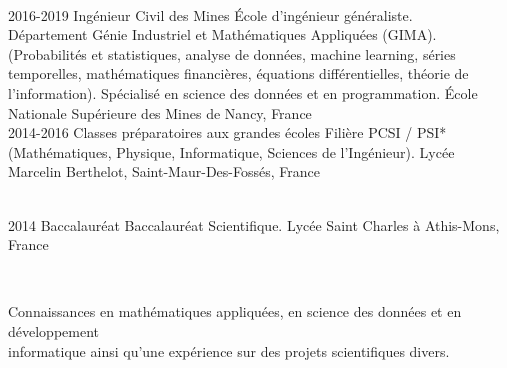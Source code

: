 \documentclass[cv]{cv_style}
\begin{document}
{\begin{minipage}[t]{\textwidth}
        \vspace{.2cm}\\
        \begin{liste}
            \educationentryfr
                {2016-2019}
                {Ingénieur Civil des Mines }
                {
				École d'ingénieur généraliste.\\ 
				Département Génie Industriel et Mathématiques Appliquées (GIMA).\\
				(Probabilités et statistiques, analyse de données, machine learning, séries \\temporelles, mathématiques financières, équations différentielles, théorie de \\ l'information). 
				Spécialisé en science des données et en programmation.
                }
                { École Nationale Supérieure des Mines de Nancy, France }
		  \vspace{-.6cm}\\
		  \educationentryfr
                {2014-2016}
                {Classes préparatoires aux grandes écoles }
                { Filière PCSI / PSI* (Mathématiques, Physique, Informatique, Sciences de l'Ingénieur). }
                { Lycée Marcelin Berthelot, Saint-Maur-Des-Fossés, France }
                    
		  \vspace{-.6cm}\\
		  \educationentryfr
			 {2014}
                {Baccalauréat}
                { Baccalauréat Scientifique.  }
                { Lycée Saint Charles à Athis-Mons, France }
        \end{liste}

\vspace{0.3cm}\\

        \begin{skillenv}
					Connaissances en mathématiques appliquées, en science des données et en développement \\informatique ainsi qu'une expérience sur des projets scientifiques divers.\\ 
            
						\vspace{-0.1cm}\\


\end{skillenv}
\end{minipage}}
\end{document}
